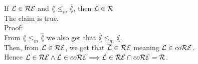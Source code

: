 If $\mathcal{L} \in \mathcal{R}\mathcal{E}$ and $\lang \leq_m \overline{\lang}$, then $\mathcal{L} \in \mathcal{R}$ \\
The claim is true. \\

Proof: \\
From $\lang \leq_m \overline{\lang}$ we also get that $\overline{\lang} \leq_m \lang$.  \\
Then, from $\mathcal{L} \in \mathcal{R}\mathcal{E}$, we get that $\overline{\mathcal{L}} \in \mathcal{R}\mathcal{E}$ meaning $\mathcal{L} \in co\mathcal{R}\mathcal{E}$. \\
Hence $\mathcal{L} \in \mathcal{R}\mathcal{E} \wedge \mathcal{L} \in co\mathcal{R}\mathcal{E} \Longrightarrow \mathcal{L} \in \mathcal{R}\mathcal{E} \cap co\mathcal{R}\mathcal{E} = \mathcal{R}$. \\
